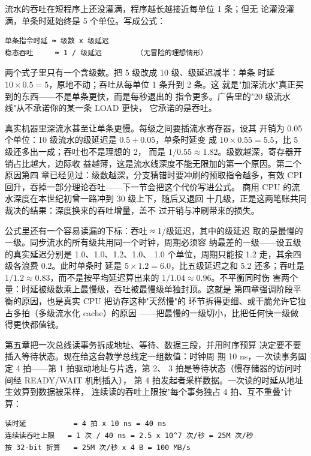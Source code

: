 流水的吞吐在短程序上还没灌满，程序越长越接近每单位 1 条；但无
论灌没灌满，单条时延始终是 5 个单位。写成公式：

\begin{lstlisting}
单条指令时延 ≈ 级数 x 级延迟
稳态吞吐     ≈ 1 / 级延迟        （无冒险的理想情形）
\end{lstlisting}

两个式子里只有一个含级数。把 5 级改成 10 级、级延迟减半：单条
时延 $10\times0.5=5$，原地不动；吞吐从每单位 1 条升到 2 条。这
就是"加深流水"真正买到的东西——不是单条更快，而是每秒退出的
指令更多。广告里的"20 级流水线"从不承诺你的某一条 LOAD 更快，
它承诺的是吞吐。

真实机器里深流水甚至让单条更慢。每级之间要插流水寄存器，设其
开销为 0.05 个单位：10 级流水的级延迟是 $0.5+0.05$，单条时延变
成 $10\times0.55=5.5$，比 5 级还多出一成；吞吐也不是理想的 2，
而是 $1/0.55\approx1.82$。级数越深，寄存器开销占比越大，边际收
益越薄，这是流水线深度不能无限加的第一个原因。第二个原因第四
章已经见过：级数越深，分支猜错时要冲刷的预取指令越多，有效
CPI 回升，吞掉一部分理论吞吐——下一节会把这个代价写进公式。
商用 CPU 的流水深度在本世纪初曾一路冲到 30 级上下，随后又退回
十几级，正是这两笔账共同裁决的结果：深度换来的吞吐增量，盖不
过开销与冲刷带来的损失。

公式里还有一个容易读漏的下标：吞吐 ≈ 1/级延迟，其中的级延迟
取的是最慢的一级。同步流水的所有级共用同一个时钟，周期必须容
纳最差的一级——设五级的真实延迟分别是 1.0、1.0、1.2、1.0、
1.0 个单位，周期只能按 1.2 走，其余四级各浪费 0.2。此时单条时
延是 $5\times1.2=6.0$，比五级延迟之和 5.2 还多；吞吐是
$1/1.2\approx0.83$，而不是按平均延迟算出来的 $1/1.04\approx0.96$。不平衡同时伤
害两个量：时延被级数乘上最慢级，吞吐被最慢级单独封顶。这就是
第四章强调阶段平衡的原因，也是真实 CPU 把访存这种"天然慢"的
环节拆得更细、或干脆允许它独占多拍（多级流水化 cache）的原因
——把最慢的一级切小，比把任何快一级做得更快都值钱。

第五章把一次总线读事务拆成地址、等待、数据三段，并用时序预算
决定要不要插入等待状态。现在给这台教学总线定一组数值：时钟周
期 10 ns，一次读事务固定 4 拍——第 1 拍驱动地址与片选，第 2、
3 拍是等待状态（慢存储器的访问时间经 READY/WAIT 机制插入），
第 4 拍发起者采样数据。一次读的时延从地址生效算到数据被采样，
连续读的吞吐上限按"每个事务独占 4 拍、互不重叠"计算：

\begin{lstlisting}
读时延           = 4 拍 x 10 ns = 40 ns
连续读吞吐上限   = 1 次 / 40 ns = 2.5 x 10^7 次/秒 = 25M 次/秒
按 32-bit 折算   = 25M 次/秒 x 4 B = 100 MB/s
\end{lstlisting}

